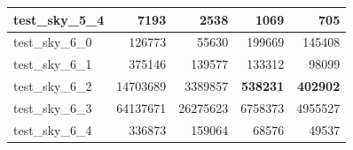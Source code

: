 \documentclass{article}
\begin{document}
\begin{table}[H]
\begin{center}
\begin{tabular}{|l|r|r|r|r|}
				test\_sky\_5\_4 & 7193                             & 2538                             & 1069                                   & 705                                    \\ \hline
				test\_sky\_6\_0 & 126773                           & 55630                            & 199669                                 & 145408                                 \\ \hline
				test\_sky\_6\_1 & 375146                           & 139577                           & 133312                                 & 98099                                  \\ \hline
				test\_sky\_6\_2 & 14703689                         & 3389857                          & \textbf{538231}                        & \textbf{402902}                        \\ \hline
				test\_sky\_6\_3 & 64137671                         & 26275623                         & 6758373                                & 4955527                                \\ \hline
				test\_sky\_6\_4 & 336873                           & 159064                           & 68576                                  & 49537                                  \\ \hline
			\end{tabular}
		\end{center}
	\end{table}
\end{document}
